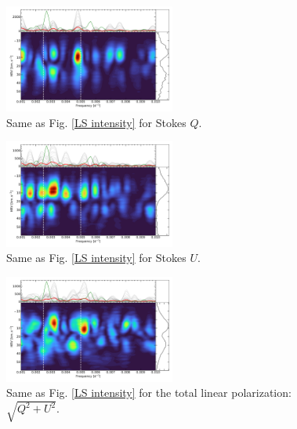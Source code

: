 \documentclass{aa}
\begin{document}
\begin{figure}[!h]
    \centering
    \includegraphics[width=0.5\textwidth]{Lomb-Scargle Stokes Q.pdf}
    \caption{Same as Fig. \ref{LS intensity} for Stokes $Q$. }
    \label{LS Q}
\end{figure}

\begin{figure}[!h]
    \centering
    \includegraphics[width=0.5\textwidth]{Lomb-Scargle Stokes U.pdf}
    \caption{Same as Fig. \ref{LS intensity} for Stokes $U$.}
    \label{LS U}
\end{figure}


\begin{figure}[!h]
    \centering
    \includegraphics[width=0.5\textwidth]{Lomb-Scargle linear polarization.pdf}
    \caption{Same as Fig. \ref{LS intensity} for the total linear polarization: $\sqrt{Q^2+U^2}$.}
    \label{LS linear polarization}
\end{figure}



\end{document}

